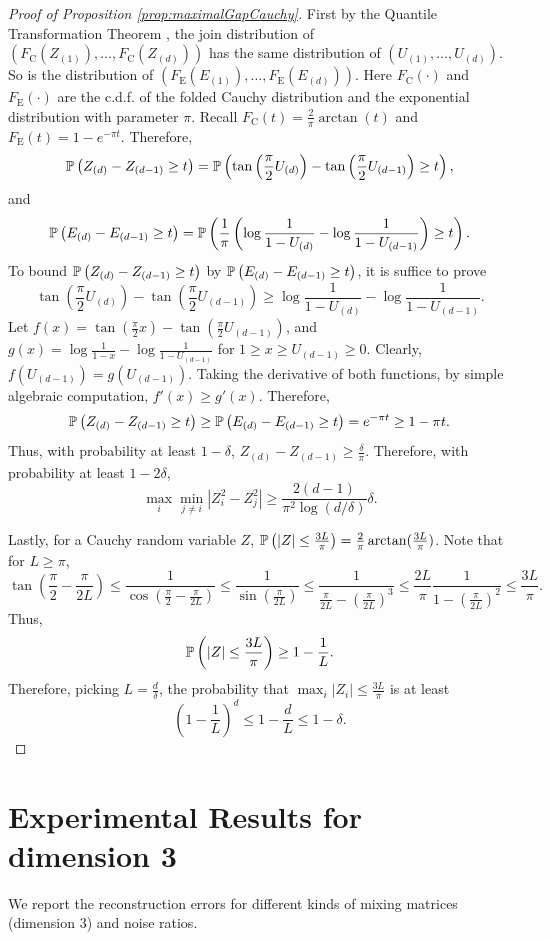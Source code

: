 \begin{proof}[Proof of Proposition \ref{prop:maximalGapCauchy}]
First by the Quantile Transformation Theorem \citep{dasgupta2011finite}, the join distribution of \\ $(F_{\text{C}}(Z_{(1)}), \ldots, F_{\text{C}}(Z_{(d)}))$ has the same distribution of $(U_{(1)}, \ldots, U_{(d)})$. So is the distribution of $(F_{\text{E}}(E_{(1)}), \ldots, F_{\text{E}}(E_{(d)}))$. 
Here $F_{\text{C}}(\cdot)$ and $F_{\text{E}}(\cdot)$ are the c.d.f. of the folded Cauchy distribution and the exponential distribution with parameter $\pi$. 
Recall $F_{\text{C}}(t) = \frac{2}{\pi}\arctan(t)$ and $F_{\text{E}}(t) = 1-e^{-\pi t}$. 
Therefore,
\[
\mathbb{P}\left( Z_{(d)} - Z_{(d-1)} \ge t\right) = \mathbb{P}\left(\tan\left(\frac{\pi}{2}U_{(d)} \right) - \tan\left(\frac{\pi}{2}U_{(d-1)}\right) \ge t \right),
\]
and 
\[
\mathbb{P}\left(E_{(d)} - E_{(d-1)} \ge t\right) = \mathbb{P}\left(\frac{1}{\pi} \left( \log \frac{1}{1-U_{(d)}} - \log \frac{1}{1-U_{(d-1)}} \right) \ge t\right).
\]
To bound $\mathbb{P}\left( Z_{(d)} - Z_{(d-1)} \ge t\right)$ by $\mathbb{P}\left(E_{(d)} - E_{(d-1)} \ge t\right)$, it is suffice to prove 
\[
\tan\left(\frac{\pi}{2}U_{(d)} \right) - \tan\left(\frac{\pi}{2}U_{(d-1)}\right) \ge \log \frac{1}{1-U_{(d)}} - \log \frac{1}{1-U_{(d-1)}} .
\] 
Let $f(x) = \tan\left(\frac{\pi}{2}x \right) - \tan\left(\frac{\pi}{2}U_{(d-1)}\right)$, and $g(x) = \log \frac{1}{1-x} - \log \frac{1}{1-U_{(d-1)}}$ for $1\ge x\ge U_{(d-1)}\ge 0 $.
Clearly, $f(U_{(d-1)}) = g(U_{(d-1)})$. Taking the derivative of both functions, by simple algebraic computation, $f'(x) \ge g'(x)$.
Therefore,
\[
\mathbb{P}\left( Z_{(d)} - Z_{(d-1)} \ge t\right) \ge \mathbb{P}\left(E_{(d)} - E_{(d-1)} \ge t\right) = e^{-\pi t} \ge 1-\pi t.
\]
Thus, with probability at least $1-\delta$, $Z_{(d)} - Z_{(d-1)} \ge \frac{\delta}{\pi}$.
Therefore, with probability at least $1-2\delta$,
\[
\max_i \min_{j\neq i} |Z_i^2 - Z_j^2| \ge \frac{2(d-1)}{\pi^2 \log(d/\delta)}\delta.
\]

Lastly, for a Cauchy random variable $Z$, $\mathbb{P}\left(|Z|\le \frac{3L}{\pi}\right)  = \frac{2}{\pi}\arctan(\frac{3L}{\pi})$.
Note that for $L\ge \pi$,
\[
\tan(\frac{\pi}{2} - \frac{\pi}{2L}) \le \frac{1}{\cos (\frac{\pi}{2} - \frac{\pi}{2L})} \le \frac{1}{\sin(\frac{\pi}{2L})}\le \frac{1}{\frac{\pi}{2L} - \left( \frac{\pi}{2L}\right)^3}\le \frac{2L}{\pi} \frac{1}{1 - \left(\frac{\pi}{2L}\right)^2} \le \frac{3L}{\pi}.
\]
Thus, 
\[
\mathbb{P}\left(|Z|\le \frac{3L}{\pi}\right)  \ge 1 - \frac{1}{L}.
\]
Therefore, picking $L = \frac{d}{\delta}$, the probability that $\max_i |Z_i| \le \frac{3L}{\pi}$ is at least 
\[
\left(1-\frac{1}{L}\right)^d \le 1-\frac{d}{L} \le 1-\delta.
\]
\end{proof}

\section{Experimental Results for dimension 3}
\label{sec:results_d3}
We report the reconstruction errors for different kinds of mixing matrices (dimension 3) and noise ratios.

